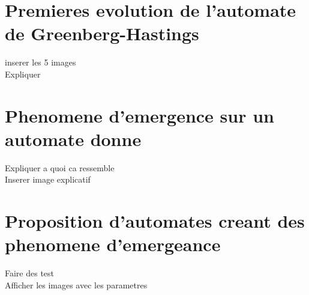 \documentclass[12pt, a4paper]{article}
\begin{document}
    
    \section{Premieres evolution de l'automate de Greenberg-Hastings}
        inserer les 5 images\\
        Expliquer
    
    
    \section{Phenomene d'emergence sur un automate donne}
        Expliquer a quoi ca ressemble\\
        Inserer image explicatif
        
    
    \section{Proposition d'automates creant des phenomene d'emergeance}
        Faire des test\\
        Afficher les images avec les parametres
    
\end{document}
